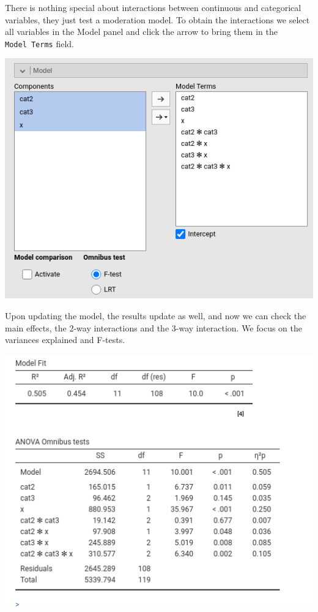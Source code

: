 \documentclass[
]{book}
\begin{document}
There is nothing special about interactions between continuous and categorical variables, they just test a moderation model. To obtain the interactions we select all variables in the {Model} panel and click the arrow to bring them in the \texttt{Model\ Terms} field.

\includegraphics[width=7.88in]{bookletpics/2_ancova_input3}

Upon updating the model, the results update as well, and now we can check the main effects, the 2-way interactions and the 3-way interaction. We focus on the variances explained and F-tests.

\includegraphics[width=6.93in]{bookletpics/2_ancova_output3}
\end{document}
